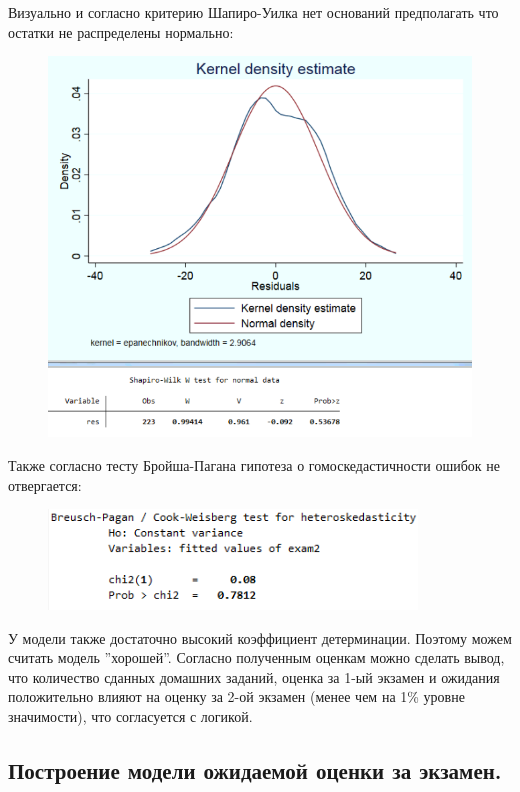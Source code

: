 \documentclass[12pt,a4paper, oneside]{extreport}
\begin{document}
\newpage

Визуально и согласно критерию Шапиро-Уилка нет оснований предполагать что остатки не распределены нормально:

\begin{figure}[h!]
	\centering
	\includegraphics[width=0.7\linewidth]{screenshot005}
	\label{fig:screenshot005}
\end{figure}


Также согласно тесту Бройша-Пагана гипотеза о гомоскедастичности ошибок не отвергается:

\begin{figure}[h!]
	\centering
	\includegraphics{screenshot006}
	\label{fig:screenshot006}
\end{figure}

У модели также достаточно высокий коэффициент детерминации. Поэтому можем считать модель ''хорошей''. Согласно полученным оценкам можно сделать вывод, что количество сданных домашних заданий, оценка за 1-ый экзамен и ожидания положительно влияют на оценку за 2-ой экзамен (менее чем на 1\% уровне значимости), что согласуется с логикой. 


\newpage

\subsection{Построение модели  ожидаемой оценки за экзамен.}
\end{document}
